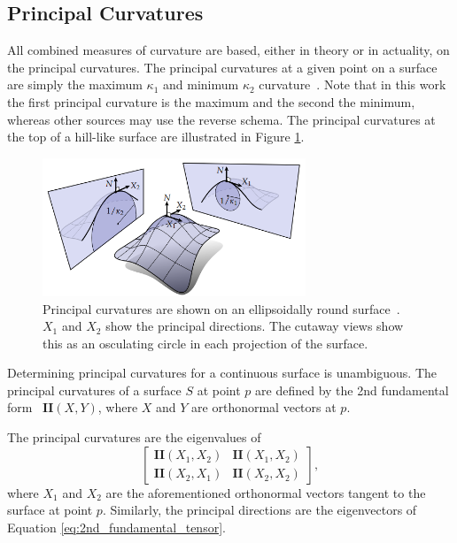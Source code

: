 \subsection{Principal Curvatures}
All combined measures of curvature are based, either in theory or in actuality, on the principal curvatures.
The principal curvatures at a given point on a surface are simply the maximum $\kappa_1$ and minimum $\kappa_2$ curvature~\cite{DDGAppIntro_17_smooth_k}.
Note that in this work the first principal curvature is the maximum and the second the minimum, whereas other sources may use the reverse schema.
The principal curvatures at the top of a hill-like surface are illustrated in Figure \ref{fig:principal_k}.

\begin{figure}[htb]
	\centering
	\includegraphics[width=0.7\textwidth]{../resources/curvature/principal_curvatures.png}
	\caption{
Principal curvatures are shown on an ellipsoidally round surface~\cite{Digital_geom_proc_w_disc_ext_calc}.
$X_1$ and $X_2$ show the principal directions.
The cutaway views show this as an osculating circle in each projection of the surface.
}
	\label{fig:principal_k}
\end{figure}

Determining principal curvatures for a continuous surface is unambiguous.
The principal curvatures of a surface $S$ at point $p$ are defined by the 2nd fundamental form~\cite{DiffGeo_curves_surfaces, Basic_diff_geo_of_surfaces, DDGAppIntro_17_smooth_k} $\textbf{II}(X,Y)$, where $X$ and $Y$ are orthonormal vectors at $p$.

The principal curvatures are the eigenvalues of
\begin{equation}\label{eq:2nd_fundamental_tensor}
	\begin{bmatrix}
		\textbf{II}(X_1, X_2) & \textbf{II}(X_1, X_2) \\
		\textbf{II}(X_2, X_1) & \textbf{II}(X_2, X_2)
	\end{bmatrix},
\end{equation}
where $X_1$ and $X_2$ are the aforementioned orthonormal vectors tangent to the surface at point $p$.
Similarly, the principal directions are the eigenvectors of Equation \ref{eq:2nd_fundamental_tensor}.

